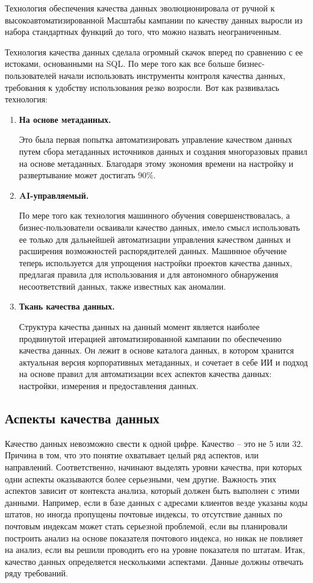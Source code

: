 \documentclass{article}
\begin{document}
Технология обеспечения качества данных эволюционировала от ручной к высокоавтоматизированной Масштабы кампании по качеству данных выросли из набора стандартных функций до того, что можно назвать неограниченным.

Технология качества данных сделала огромный скачок вперед по сравнению с ее истоками, основанными на SQL. По мере того как все больше бизнес-пользователей начали использовать инструменты контроля качества данных, требования к удобству использования резко возросли. Вот как развивалась технология:

\begin{enumerate}
    \item \textbf{На основе метаданных.} 
    
    Это была первая попытка автоматизировать управление качеством данных путем сбора метаданных источников данных и создания многоразовых правил на основе метаданных. Благодаря этому экономия времени на настройку и развертывание может достигать 90\%.
    \item \textbf{AI-управляемый.}

    По мере того как технология машинного обучения совершенствовалась, а бизнес-пользователи осваивали качество данных, имело смысл использовать ее только для дальнейшей автоматизации управления качеством данных и расширения возможностей распорядителей данных. Машинное обучение теперь используется для упрощения настройки проектов качества данных, предлагая правила для использования и для автономного обнаружения несоответствий данных, также известных как аномалии.

    \item \textbf{Ткань качества данных.}

    Структура качества данных на данный момент является наиболее продвинутой итерацией автоматизированной кампании по обеспечению качества данных. Он лежит в основе каталога данных, в котором хранится актуальная версия корпоративных метаданных, и сочетает в себе ИИ и подход на основе правил для автоматизации всех аспектов качества данных: настройки, измерения и предоставления данных.
\end{enumerate}

\subsection{Аспекты качества данных}

Качество данных невозможно свести к одной цифре. Качество – это не 5 или 32. Причина в том, что это понятие охватывает целый ряд аспектов, или направлений. Соответственно, начинают выделять уровни качества, при которых одни аспекты оказываются более серьезными, чем другие. Важность этих аспектов зависит от контекста анализа, который должен быть выполнен с этими данными. Например, если в базе данных с адресами клиентов везде указаны коды штатов, но иногда пропущены почтовые индексы, то отсутствие данных по почтовым индексам может стать серьезной проблемой, если вы планировали построить анализ на основе показателя почтового индекса, но никак не повлияет на анализ, если вы решили проводить его на уровне показателя по штатам.
Итак, качество данных определяется несколькими аспектами. Данные должны отвечать ряду требований.
\end{document}
